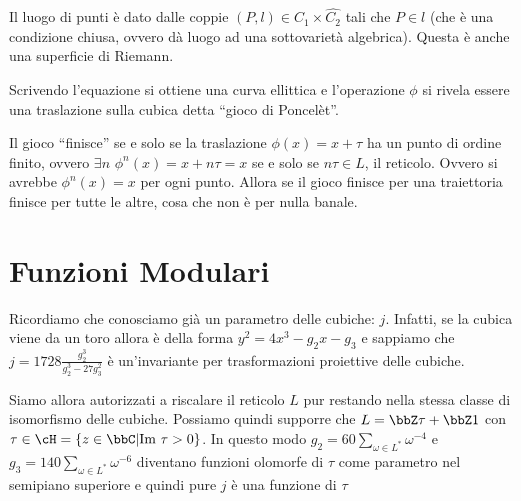 Il luogo di punti è dato dalle coppie $(P, l) \in C_1 \times \hat{C_2}$
tali che $P \in l$ (che è una condizione chiusa, ovvero dà luogo ad una
sottovarietà algebrica). Questa è anche una superficie di Riemann.

Scrivendo l'equazione si ottiene una curva ellittica e l'operazione
$\phi$ si rivela essere una traslazione sulla cubica detta ``gioco di
Poncelèt''.

Il gioco ``finisce'' se e solo se la traslazione $\phi(x) = x + \tau$ ha
un punto di ordine finito, ovvero $\exists n$
$\phi^n (x) = x + n\tau = x$ se e solo se $n\tau \in L$, il
reticolo. Ovvero si avrebbe $\phi^n(x) = x$ per ogni punto. Allora se il
gioco finisce per una traiettoria finisce per tutte le altre, cosa che
non è per nulla banale.


\section{Funzioni Modulari}


\begin{osservazione}
  Ricordiamo che conosciamo già un parametro delle cubiche:
  $j$. Infatti, se la cubica viene da un toro allora è della forma
  $y^2 = 4 x^3 - g_2 x - g_3$ e sappiamo che
  $j = 1728 \frac{g_2^3}{g_2^3 - 27 g_3^2}$ è un'invariante per
  trasformazioni proiettive delle cubiche.
\end{osservazione}

Siamo allora autorizzati a riscalare il reticolo $L$ pur restando nella
stessa classe di isomorfismo delle cubiche. Possiamo quindi supporre che
$L = \bbZ \tau + \bbZ 1$ con $\tau \in \cH = \{ z \in \bbC | \Img \tau >
0 \}$. In questo modo $g_2 = 60 \sum_{\omega \in L^*} \omega^{-4}$ e
$g_3 = 140 \sum_{\omega \in L^*} \omega^{-6}$ diventano funzioni
olomorfe di $\tau$ come parametro nel semipiano superiore e quindi pure
$j$ è una funzione di $\tau$

